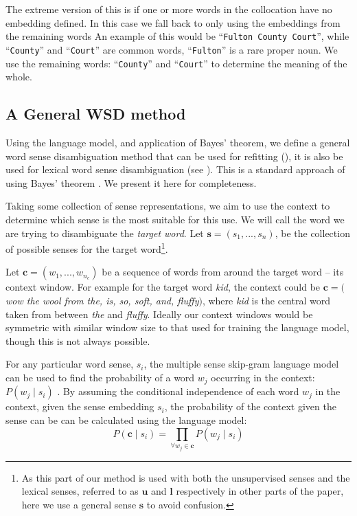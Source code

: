 \documentclass{sig-alternate}
\renewcommand{\c}{\mathbf{c}}
\newcommand{\s}{\mathbf{s}}
\renewcommand{\l}{\mathbf{l}}
\renewcommand{\u}{\mathbf{u}}
\newcommand{\wordquote}[1]{\enquote{\texttt{#1}}}
\begin{document}
The extreme version of this is if one or more words in the collocation have no embedding defined. In this case we fall back to only using the embeddings from the remaining words An example of this would be \wordquote{Fulton County Court}, while \wordquote{County} and \wordquote{Court} are common words, \wordquote{Fulton} is a rare proper noun. We use the remaining words: \wordquote{County} and \wordquote{Court} to determine the meaning of the whole.



\subsection{A General WSD method} \label{generalwsd}
Using the language model, and application of Bayes' theorem, we define a general word sense disambiguation method that can be used for refitting (), it is also be used for lexical word sense disambiguation (see ). This is a standard approach of using Bayes' theorem \parencite{tian2014probabilistic, AdaGrams}. We present it here for completeness.

Taking some collection of sense representations, we aim to use the context to determine which sense is the most suitable for this use.
We will call the word we are trying to disambiguate the \emph{target word}.
Let $\s=(s_{1},...,s_{n})$, be the collection of possible senses for the target word\footnote{As this part of our method is used with both the unsupervised senses and the lexical senses, referred to as $\u$ and $\l$ respectively in other parts of the paper, here we use a general sense $\s$ to avoid confusion.}.

Let $\c=(w_{1},...,w_{n_c})$ be a sequence of words from around the target word -- its context window.
For example for the target word \emph{kid}, the context could be $\c=($ \emph{ wow the wool from the, is, so, soft, and, fluffy}$)$, where \emph{kid} is the central word taken from between \emph{the} and \emph{fluffy}.
Ideally our context windows would be symmetric with similar window size to that used for training the language model, though this is not always possible.

For any particular word sense, $s_i$, the multiple sense skip-gram language model can be used to
find the probability of a word $w_j$ occurring in the context: $P(w_j \mid s_i)$
\parencite{tian2014probabilistic,AdaGrams}.
By assuming the conditional independence of each word $w_j$ in the context, given the sense embedding $s_i$, the probability of the context given the sense can be can be calculated using the language model:
\begin{equation} \label{eq:contextprobtrue}
P(\c \mid s_{i})=\prod_{\forall w_{j}\in\c}P(w_{j} \mid s_{i})
\end{equation}
\end{document}
